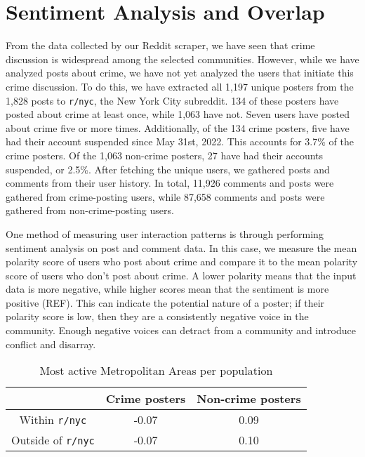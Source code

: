 \documentclass[12pt,oneside, letterpaper]{book}
\begin{document}
\section{Sentiment Analysis and Overlap}

\par From the data collected by our Reddit scraper, we have seen that crime discussion is widespread among the selected communities. However, while we have analyzed posts about crime, we have not yet analyzed the users that initiate this crime discussion. To do this, we have extracted all 1,197 unique posters from the 1,828 posts to \texttt{r/nyc}, the New York City subreddit. 134 of these posters have posted about crime at least once, while 1,063 have not. Seven users have posted about crime five or more times. Additionally, of the 134 crime posters, five have had their account suspended since May 31st, 2022. This accounts for 3.7\% of the crime posters. Of the 1,063 non-crime posters, 27 have had their accounts suspended, or 2.5\%. After fetching the unique users, we gathered posts and comments from their user history. In total, 11,926 comments and posts were gathered from crime-posting users, while 87,658 comments and posts were gathered from non-crime-posting users.

\par One method of measuring user interaction patterns is through performing sentiment analysis on post and comment data. In this case, we measure the mean polarity score of users who post about crime and compare it to the mean polarity score of users who don't post about crime. A lower polarity means that the input data is more negative, while higher scores mean that the sentiment is more positive (REF). This can indicate the potential nature of a poster; if their polarity score is low, then they are a consistently negative voice in the community. Enough negative voices can detract from a community and introduce conflict and disarray.

\begin{table}[h!]
    \centering
    \small
    \caption{Most active Metropolitan Areas per population}
    \begin{tabular}{| c | c | c |}
    \hline
     & Crime posters & Non-crime posters \\ \hline
    Within \texttt{r/nyc} &  -0.07 & 0.09 \\ \hline
    Outside of \texttt{r/nyc} & -0.07 & 0.10 \\ \hline
	\end{tabular}
	\label{table:table-6}
\end{table}
\end{document}
